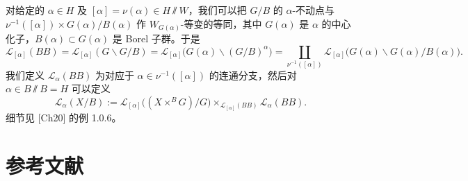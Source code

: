 对给定的 $\alpha\in H$ 及 $[\alpha]=\nu(\alpha)\in H\sslash W$，我们可以把 $G/B$ 的 $\alpha$-不动点与 $\nu^{-1}([\alpha])\times G(\alpha)/B(\alpha)$ 作 $W_{G(\alpha)}$-等变的等同，其中 $G(\alpha)$ 是 $\alpha$ 的中心化子，$B(\alpha)\subset G(\alpha)$ 是 Borel 子群。于是
\[
\mathcal L_{[\alpha]}(BB)=\mathcal L_{[\alpha]}(G\backslash G/B)
=\mathcal L_{[\alpha]}\bigl(G(\alpha)\backslash(G/B)^\alpha\bigr)
=\coprod_{\nu^{-1}([\alpha])}\mathcal L_{[\alpha]}\bigl(G(\alpha)\backslash G(\alpha)/B(\alpha)\bigr).
\]
我们定义 $\mathcal L_\alpha(BB)$ 为对应于 $\alpha\in\nu^{-1}([\alpha])$ 的连通分支，然后对 $\alpha\in B\sslash B=H$ 可以定义
\[
\mathcal L_\alpha(X/B):=\mathcal L_{[\alpha]}\bigl((X\times^B G)/G\bigr)
\times_{\mathcal L_{[\alpha]}(BB)}\mathcal L_\alpha(BB).
\]
细节见 [Ch20] 的例 1.0.6。

\section*{参考文献}

